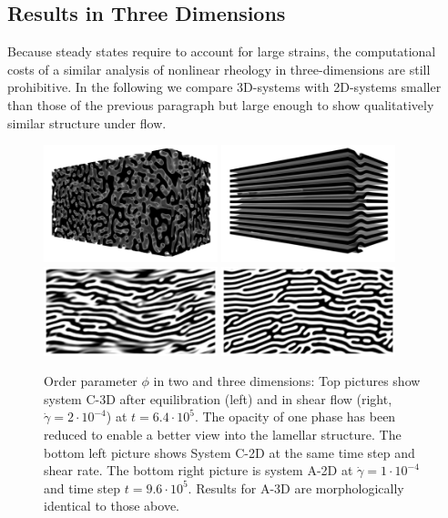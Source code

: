 \documentclass[8.5pt,twoside,twocolumn]{article}
\newcommand{\e}[1]{\cdot10^{#1}}
\begin{document}
\subsection*{Results in Three Dimensions}

Because steady states require to account for large strains, the computational costs of a similar analysis of nonlinear rheology in three-dimensions are still prohibitive.
In the following we compare 3D-systems with 2D-systems smaller than those of the previous paragraph but large enough to show qualitatively similar structure under flow.

\begin{figure}[htp!]
\centering
\includegraphics[angle=0,width=0.45\textwidth]{phi_run1002_320k.png}
\includegraphics[angle=0,width=0.45\textwidth]{phi_run1002_640k.png}
\includegraphics[angle=0,width=0.45\textwidth]{phi_run1001_640k.png}
\includegraphics[angle=0,width=0.45\textwidth]{phi_run1003_960k.png}
\caption{Order parameter $\phi$ in two and three dimensions: Top pictures show system C-3D after equilibration (left) and in shear flow (right, $\dot{\gamma}=2\cdot10^{-4}$) at $t=6.4\e{5}$. The opacity of one phase has been reduced to enable a better view into the lamellar structure. The bottom left picture shows System C-2D at the same time step and shear rate. The bottom right picture is system A-2D at $\dot{\gamma}=1\cdot10^{-4}$ and time step $t=9.6\e{5}$. Results for A-3D are morphologically identical to those above.} 
\label{fig12}
\end{figure}
\end{document}
